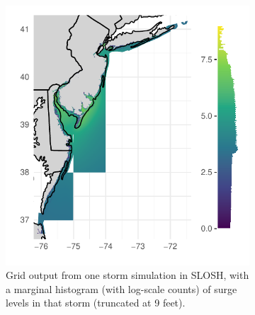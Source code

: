 \begin{figure}[t!]
    \centering
    \begin{subfigure}[t]{0.48\textwidth}
        \centering
        \includegraphics[width=0.99\linewidth]{./plots/slosh1run_loghist.pdf}
        \caption{Grid output from one storm simulation in SLOSH, with a marginal
            histogram (with log-scale counts) of surge levels in that storm 
            (truncated at 9 feet).\label{fig:slosh1run}}
    \end{subfigure}%
    ~ 
    \begin{subfigure}[t]{0.48\textwidth}
        \centering

\end{subfigure}
\end{figure}
